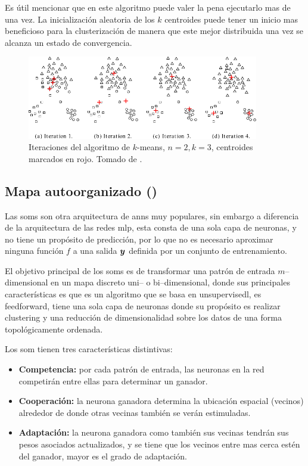 Es útil mencionar que en este algoritmo puede valer la pena ejecutarlo mas de una vez. La inicialización aleatoria de los $k$ centroides puede tener un inicio mas beneficioso para la clusterización de manera que este mejor distribuida una vez se alcanza un estado de convergencia.

\begin{figure}[H]
  \centering
  \includegraphics[width=0.9\textwidth]{Figures/k-mean-iteration.pdf}
  \decoRule
  \caption[Iteraciones del algoritmo de $k$-means]{Iteraciones del algoritmo de $k$-means, $n = 2, k = 3$, centroides marcados en rojo. Tomado de \cite{tan2005introduction}.}
  \label{fig:k-means-iterations}
\end{figure}


\subsection{Mapa autoorganizado ()} \label{subsec:SOM}
Las \glspl{som} son otra arquitectura de \glspl{ann} muy populares, sin embargo a diferencia de la arquitectura de las redes \gls{mlp}, esta consta de una sola capa de neuronas, y no tiene un propósito de predicción, por lo que no es necesario aproximar ninguna función $f$ a una salida ${\bm{y}}$ definida por un conjunto de entrenamiento.

El objetivo principal de los \glspl{som} es de transformar una patrón de entrada $m$--dimensional en un mapa discreto uni-- o bi--dimensional, donde sus principales características es que es un algoritmo que se basa en \gls{unsupervisedl}, es \gls{feedforward}, tiene una sola capa de neuronas donde su propósito es realizar \gls{clustering} y una reducción de dimensionalidad sobre los datos de una forma topológicamente ordenada.

Los \gls{som} tienen tres características distintivas:
\begin{itemize}
\item {\bf Competencia:} por cada patrón de entrada, las neuronas en la red competirán entre ellas para determinar un ganador.
\item {\bf Cooperación:} la neurona ganadora determina la ubicación espacial (vecinos) alrededor de donde otras vecinas también se verán estimuladas.
\item {\bf Adaptación:} la neurona ganadora como también sus vecinas tendrán sus pesos asociados actualizados, y se tiene que los vecinos entre mas cerca estén del ganador, mayor es el grado de adaptación.
\end{itemize}

